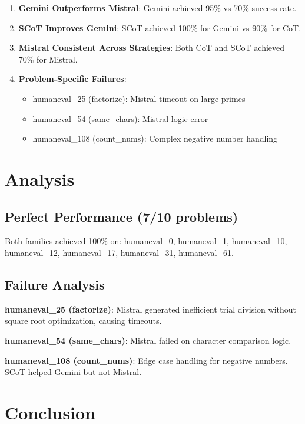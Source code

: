 \documentclass[11pt]{article}
\begin{document}
\begin{enumerate}
    \item \textbf{Gemini Outperforms Mistral}: Gemini achieved 95\% vs 70\% success rate.
    
    \item \textbf{SCoT Improves Gemini}: SCoT achieved 100\% for Gemini vs 90\% for CoT.
    
    \item \textbf{Mistral Consistent Across Strategies}: Both CoT and SCoT achieved 70\% for Mistral.
    
    \item \textbf{Problem-Specific Failures}: 
    \begin{itemize}
        \item humaneval\_25 (factorize): Mistral timeout on large primes
        \item humaneval\_54 (same\_chars): Mistral logic error
        \item humaneval\_108 (count\_nums): Complex negative number handling
    \end{itemize}
\end{enumerate}

\section{Analysis}

\subsection{Perfect Performance (7/10 problems)}

Both families achieved 100\% on: humaneval\_0, humaneval\_1, humaneval\_10, humaneval\_12, humaneval\_17, humaneval\_31, humaneval\_61.

\subsection{Failure Analysis}

\textbf{humaneval\_25 (factorize)}: Mistral generated inefficient trial division without square root optimization, causing timeouts.

\textbf{humaneval\_54 (same\_chars)}: Mistral failed on character comparison logic.

\textbf{humaneval\_108 (count\_nums)}: Edge case handling for negative numbers. SCoT helped Gemini but not Mistral.

\section{Conclusion}
\end{document}
